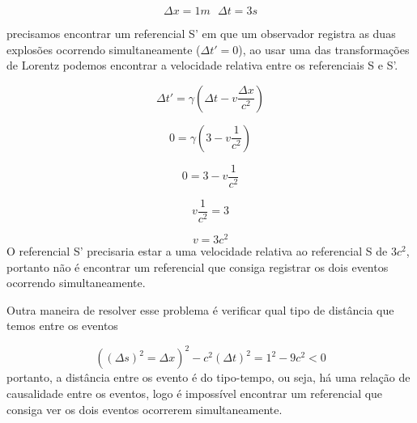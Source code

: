 \documentclass[10pt,a4paper]{article}
\begin{document}
	 $$\Delta x = 1 m \,\,\,\, \Delta t = 3s $$
	 
	 precisamos encontrar um referencial S' em que um observador registra as duas explosões ocorrendo simultaneamente ($ \Delta t' = 0 $), ao usar uma das transformações de Lorentz podemos encontrar a velocidade relativa entre os referenciais S e S'.
	 
	 $$ \Delta t' = \gamma \left( \Delta t - v \dfrac{\Delta x}{c^2}\right)$$

	 $$ 0 = \gamma \left( 3 - v \dfrac{1}{c^2}\right) $$
	 
	 $$ 0 =  3 - v \dfrac{1}{c^2} $$
	 
	 $$ v \dfrac{1}{c^2} = 3$$
	 
	 $$ v = 3c^2$$
	O referencial S' precisaria estar a uma velocidade relativa ao referencial S de $ 3c^2 $, portanto não é encontrar um referencial que consiga registrar os dois eventos ocorrendo simultaneamente.
	
	Outra maneira de resolver esse problema é verificar qual tipo de distância que temos entre os eventos
	
	$$( (\Delta s)^2 = \Delta x)^2 - c^2 (\Delta t)^2 = 1^2 -9c^2 < 0 $$
	portanto, a distância entre os evento é do tipo-tempo, ou seja, há uma relação de causalidade entre os eventos, logo é impossível encontrar um referencial que consiga ver os dois eventos ocorrerem simultaneamente.
	
	
\end{document}
